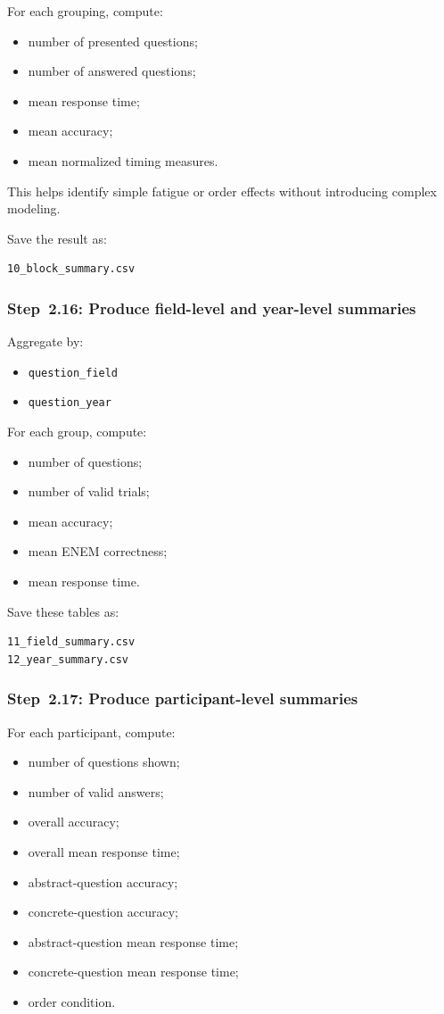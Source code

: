 For each grouping, compute:
\begin{itemize}
    \item number of presented questions;
    \item number of answered questions;
    \item mean response time;
    \item mean accuracy;
    \item mean normalized timing measures.
\end{itemize}

This helps identify simple fatigue or order effects without introducing complex modeling.

Save the result as:
\begin{verbatim}
10_block_summary.csv
\end{verbatim}

\subsubsection{Step~2.16: Produce field-level and year-level summaries}
Aggregate by:
\begin{itemize}
    \item \texttt{question\_field}
    \item \texttt{question\_year}
\end{itemize}

For each group, compute:
\begin{itemize}
    \item number of questions;
    \item number of valid trials;
    \item mean accuracy;
    \item mean ENEM correctness;
    \item mean response time.
\end{itemize}

Save these tables as:
\begin{verbatim}
11_field_summary.csv
12_year_summary.csv
\end{verbatim}

\subsubsection{Step~2.17: Produce participant-level summaries}
For each participant, compute:
\begin{itemize}
    \item number of questions shown;
    \item number of valid answers;
    \item overall accuracy;
    \item overall mean response time;
    \item abstract-question accuracy;
    \item concrete-question accuracy;
    \item abstract-question mean response time;
    \item concrete-question mean response time;
    \item order condition.
\end{itemize}


